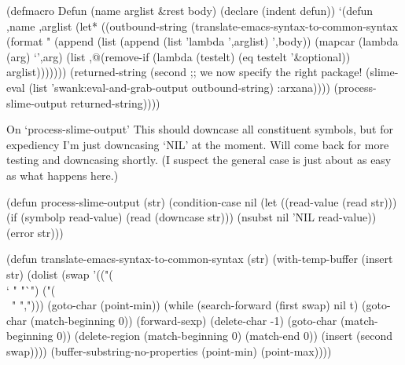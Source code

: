\begin{elisp}
(defmacro Defun (name arglist &rest body)
  (declare (indent defun))
  `(defun ,name ,arglist
     (let* ((outbound-string
             (translate-emacs-syntax-to-common-syntax
              (format "%
                      (append
                       (list
                        (append (list 'lambda ',arglist)
                                ',body))
                       (mapcar
                        (lambda (arg) `',arg)
                        (list
                         ,@(remove-if
                                 (lambda (testelt)
                                   (eq testelt
                                 '&optional))
                                 arglist)))))))
            (returned-string
             (second
              ;; we now specify the right package!
              (slime-eval
               (list 'swank:eval-and-grab-output
                     outbound-string)
               :arxana))))
       (process-slime-output returned-string))))
\end{elisp}

\begin{notate}{On `process-slime-output'}
This should downcase all constituent symbols, but for
expediency I'm just downcasing `NIL' at the moment.  Will
come back for more testing and downcasing shortly.  (I
suspect the general case is just about as easy as what
happens here.)
\end{notate}

\begin{elisp}
(defun process-slime-output (str)
  (condition-case nil
      (let ((read-value (read str)))
        (if (symbolp read-value)
            (read (downcase str)))
        (nsubst nil 'NIL read-value))
    (error str)))
\end{elisp}

\begin{elisp}
(defun translate-emacs-syntax-to-common-syntax (str)
  (with-temp-buffer
    (insert str)
    (dolist (swap '(("(\\` " "`")
                    ("(\\\, " ",")))
      (goto-char (point-min))
      (while (search-forward (first swap) nil t)
        (goto-char (match-beginning 0))
        (forward-sexp)
        (delete-char -1)
        (goto-char (match-beginning 0))
        (delete-region (match-beginning 0)
                       (match-end 0))
        (insert (second swap))))
    (buffer-substring-no-properties (point-min)
                                    (point-max))))
\end{elisp}

